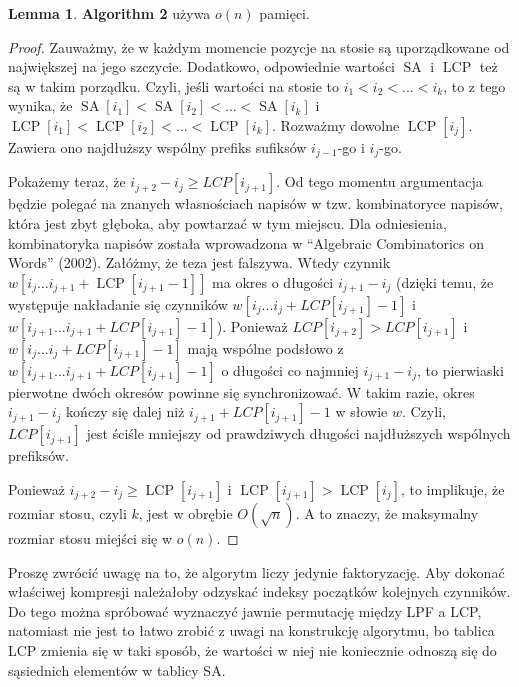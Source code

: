 \documentclass[a4paper,12pt]{article}
\theoremstyle{definition}
\newtheorem{lemma}{Lemma}[section]
\DeclareMathOperator{\SA}{SA}
\DeclareMathOperator{\LCP}{LCP}
\begin{document}
\begin{lemma}

\textbf{Algorithm 2} używa $o(n)$ pamięci.

\begin{proof}

Zauważmy, że w każdym momencie pozycje na stosie są uporządkowane od największej na jego szczycie.
Dodatkowo, odpowiednie wartości $\SA$ i $\LCP$ też są w takim porządku.
Czyli, jeśli wartości na stosie to $i_1 < i_2 < ... < i_k$, to z tego wynika,
 że $\SA[i_1] < \SA[i_2] < ... < \SA[i_k]$ i $\LCP[i_1] < \LCP[i_2] < ... < \LCP[i_k]$.
Rozważmy dowolne $\LCP[i_j]$. Zawiera ono najdłuższy wspólny prefiks sufiksów $i_{j-1}$-go i $i_{j}$-go.

Pokażemy teraz, że $i_{j + 2} - i_{j} \geq LCP[i_{j + 1}]$.
Od tego momentu argumentacja będzie polegać na znanych własnościach napisów w tzw. kombinatoryce napisów,
 która jest zbyt głęboka, aby powtarzać w tym miejscu.
Dla odniesienia, kombinatoryka napisów została wprowadzona w ``Algebraic Combinatorics on Words'' (2002).
Załóżmy, że teza jest falszywa.
Wtedy czynnik $w[i_j ... i_{j + 1} + \LCP[i_{j + 1} - 1]]$ ma okres o długości $i_{j + 1} - i_{j}$
 (dzięki temu, że występuje nakładanie się czynników $w[i_{j} ... i_{j} + LCP[i_{j + 1}] - 1]$
  i $w[i_{j + 1} ... i_{j + 1} + LCP[i_{j + 1}] - 1]$).
Ponieważ $LCP[i_{j + 2}] > LCP[i_{j + 1}]$ i $w[i_{j} ... i_{j} + LCP[i_{j + 1}] - 1]$
 mają wspólne podsłowo z $w[i_{j + 1} ... i_{j + 1} + LCP[i_{j + 1}] - 1]$
 o długości co najmniej $i_{j + 1} - i_{j}$,
 to pierwiaski pierwotne dwóch okresów powinne się synchronizować.
W takim razie, okres $i_{j + 1} - i_{j}$ kończy się dalej niż $i_{j + 1} + LCP[i_{j + 1}] - 1$ w słowie $w$.
Czyli, $LCP[i_{j + 1}]$ jest ściśle mniejszy od prawdziwych długości najdłuższych wspólnych prefiksów.

Ponieważ $i_{j + 2} - i_{j} \geq \LCP[i_{j + 1}]$ i $\LCP[i_{j + 1}] > \LCP[i_{j}]$, to implikuje,
 że rozmiar stosu, czyli $k$, jest w obrębie $O(\sqrt{n})$.
A to znaczy, że maksymalny rozmiar stosu miejści się w $o(n)$.

\end{proof}
\end{lemma}

Proszę zwrócić uwagę na to, że algorytm liczy jedynie faktoryzację.
Aby dokonać właściwej kompresji należałoby odzyskać indeksy początków kolejnych czynników.
Do tego można spróbować wyznaczyć jawnie permutację między LPF a LCP,
 natomiast nie jest to łatwo zrobić z uwagi na konstrukcję algorytmu,
 bo tablica LCP zmienia się w taki sposób, że wartości w niej nie koniecznie odnoszą się
 do sąsiednich elementów w tablicy SA.
\end{document}
